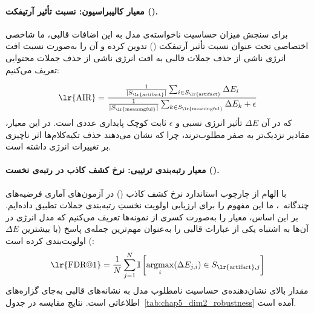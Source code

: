 \paragraph{معیار کالیبراسیون: نسبت تأثیر آرتیفکت ().}
برای سنجش میزان حساسیت ناخواسته‌ی مدل به این اضافات قالبی، ما شاخصی اختصاصی تحت عنوان نسبت تأثیر آرتیفکت () تدوین کرده و آن را به‌صورت نسبت افت انرژی ناشی از حذف جملات قالبی به افت انرژی ناشی از حذف جملات محتوایی تعریف می‌کنیم:

\begin{equation}
    \text{\lr{AIR}} = \frac{\frac{1}{|S_{\text{\lr{artifact}}}|} \sum_{i \in S_{\text{\lr{artifact}}}} \Delta E_i}{\frac{1}{|S_{\text{\lr{meaningful}}}|} \sum_{k \in S_{\text{\lr{meaningful}}}} \Delta E_k + \epsilon} \label{eq:chap5_air}
\end{equation}
که در آن $\Delta E$ تأثیر انرژی نسبی و $\epsilon$ ثابت کوچک پایداری عددی است. در این معیار، مقادیر نزدیک‌تر به صفر مطلوب‌ترند، چرا که نشان می‌دهند حذف تکیه‌کلام‌ها اثر ناچیزی بر تغییرات انرژی داشته است.

\paragraph{معیار رتبه‌بندی ترتیبی: نرخ کشف کاذب در رتبه‌ی نخست ().}
با الهام از چارچوب استاندارد نرخ کشف کاذب () در آزمون‌های آماری فرضیه‌های چندگانه~\cite{benjamini1995controlling}، ما این مفهوم را برای ارزیابی اولویت نخستِ رتبه‌بندی جملات تطبیق داده‌ایم. بر این اساس، معیار  را به‌صورت کسری از نمونه‌ها تعریف می‌کنیم که مدل انرژی در آن‌ها به اشتباه یکی از عبارات قالبی را به‌عنوان مهم‌ترین جمله‌ی پاسخ (با بیشترین $\Delta E$) اولویت‌بندی کرده است:
\begin{equation}
    \text{\lr{FDR@1}} = \frac{1}{N} \sum_{j=1}^{N} \mathbb{I}\left[ \operatorname*{argmax}_{i} (\Delta E_{j,i}) \in S_{\text{\lr{artifact}},j} \right] \label{eq:chap5_fdr}
\end{equation}
مقدار بالای  نشان‌دهنده‌ی حساسیت نامطلوب مدل به نشانه‌های قالبی به‌جای گزاره‌های اطلاعاتی است. نتایج مقایسه در جدول~\ref{tab:chap5_dim2_robustness} آمده است.

